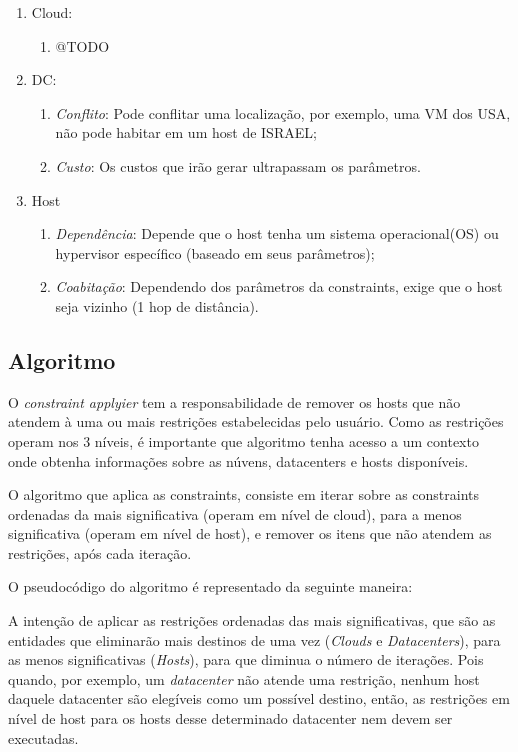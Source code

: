 \begin{enumerate}
  \item Cloud:
  \begin{enumerate}
    \item @TODO
  \end{enumerate}

  \item DC:
  \begin{enumerate}
    \item \textit{Conflito}: Pode conflitar uma localização, por exemplo, uma VM dos USA, não pode habitar em um host de ISRAEL;
    \item \textit{Custo}: Os custos que irão gerar ultrapassam os parâmetros.
  \end{enumerate}

 \item Host
  \begin{enumerate}
    \item \textit{Dependência}: Depende que o host tenha um sistema operacional(OS) ou hypervisor específico (baseado em seus parâmetros);
    \item \textit{Coabitação}: Dependendo dos parâmetros da constraints, exige que o host seja vizinho (1 hop de distância).
  \end{enumerate}
  
\end{enumerate}

\subsection{Algoritmo}
O \textit{constraint applyier} tem a responsabilidade de remover os hosts que não atendem à
uma ou mais restrições estabelecidas pelo usuário. Como as restrições operam nos 3 níveis,
é importante que algoritmo tenha acesso a um contexto onde obtenha informações sobre as núvens, 
datacenters e hosts disponíveis.

O algoritmo que aplica as constraints, consiste em iterar sobre as constraints ordenadas da mais significativa 
(operam em nível de cloud), para a menos significativa (operam em nível de host), e remover os itens que não atendem as
restrições, após cada iteração.

O pseudocódigo do algoritmo é representado da seguinte maneira:



A intenção de aplicar as restrições ordenadas das mais significativas, que são as 
entidades que eliminarão mais destinos de uma vez (\textit{Clouds} e \textit{Datacenters}),
para as menos significativas (\textit{Hosts}), para que diminua o número de iterações.
Pois quando, por exemplo, um \textit{datacenter} não atende uma restrição, nenhum host daquele datacenter 
são elegíveis como um possível destino, então, as restrições em nível de host para
os hosts desse determinado datacenter nem devem ser executadas. 

